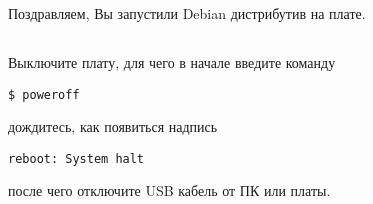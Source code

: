 Поздравляем, Вы запустили Debian дистрибутив на плате.

\subsection{} Выключите плату, для чего в начале введите команду
\begin{lstlisting}[style=bash]
$ poweroff
\end{lstlisting}
дождитесь, как появиться надпись
\begin{lstlisting}[style=stdout]
reboot: System halt
\end{lstlisting}
после чего отключите USB кабель от ПК или платы. 